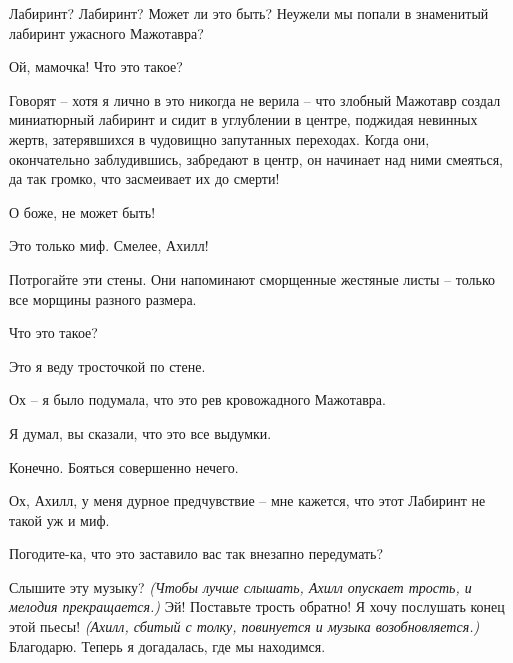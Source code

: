 \documentclass[../main.tex]{subfiles}
\begin{document}
\begin{Dialogue}
\begin{sublevel}
\begin{sublevel}
\begin{sublevel}
 Лабиринт? Лабиринт? Может ли это быть? Неужели мы попали в знаменитый лабиринт ужасного Мажотавра?

 Ой, мамочка! Что это такое?

 Говорят \--- хотя я лично в это никогда не верила \--- что злобный Мажотавр создал миниатюрный лабиринт и сидит в углублении в центре, поджидая невинных жертв, затерявшихся в чудовищно запутанных переходах. Когда они, окончательно заблудившись, забредают в центр, он начинает над ними смеяться, да так громко, что засмеивает их до смерти!

 О боже, не может быть!

 Это только миф. Смелее, Ахилл!


 Потрогайте эти стены. Они напоминают сморщенные жестяные листы \--- только все морщины разного размера.


 Что это такое?

 Это я веду тросточкой по стене.

 Ох \--- я было подумала, что это рев кровожадного Мажотавра.

 Я думал, вы сказали, что это все выдумки.

 Конечно. Бояться совершенно нечего.


 Ох, Ахилл, у меня дурное предчувствие \--- мне кажется, что этот Лабиринт не такой уж и миф.

 Погодите-ка, что это заставило вас так внезапно передумать?

 Слышите эту музыку? \emph{(Чтобы лучше слышать, Ахилл опускает трость, и мелодия прекращается.)} Эй! Поставьте трость обратно! Я хочу послушать конец этой пьесы! \emph{(Ахилл, сбитый с толку, повинуется и музыка возобновляется.)} Благодарю. Теперь я догадалась, где мы находимся.


\end{sublevel}
\end{sublevel}
\end{sublevel}
\end{Dialogue}
\end{document}
